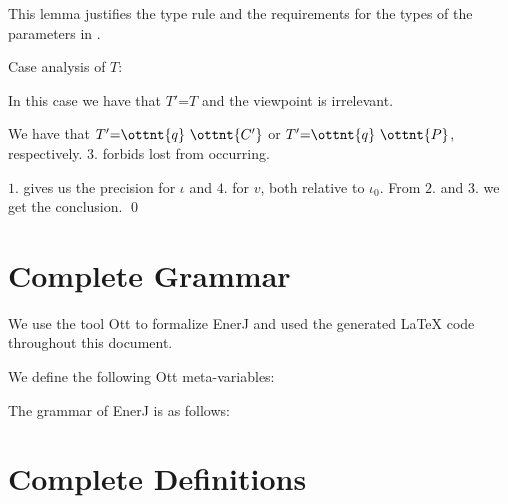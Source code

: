 \noindent
This lemma justifies the type rule  and the
requirements for the types of the parameters in
.


Case analysis of $T$:


In this case we have that $T'  \textsf{=}  T$ and the viewpoint is
irrelevant.



We have that $T'  \textsf{=}    \ottnt{q} \  \ottnt{C'}  $ or $T'  \textsf{=}    \ottnt{q} \  \ottnt{P}  $, respectively.
$3.$ forbids lost from occurring.

$1.$ gives us the precision for $\iota$ and $4.$ for $v$, both
relative to $\iota_{{\mathrm{0}}}$.
From $2.$ and $3.$ we get the conclusion.
\qed


\newpage
\section{Complete Grammar}
\label{enerj:app:grammar}

We use the tool Ott %
to formalize EnerJ and
used the generated \LaTeX{} code throughout this document.

\medskip

\noindent
We define the following Ott meta-variables:

\medskip

\ottmetavars

\bigskip

\noindent
The grammar of EnerJ is as follows:

\medskip

\ottgrammar


\section{Complete Definitions}
\label{enerj:app:defns}

\ottdefnss
